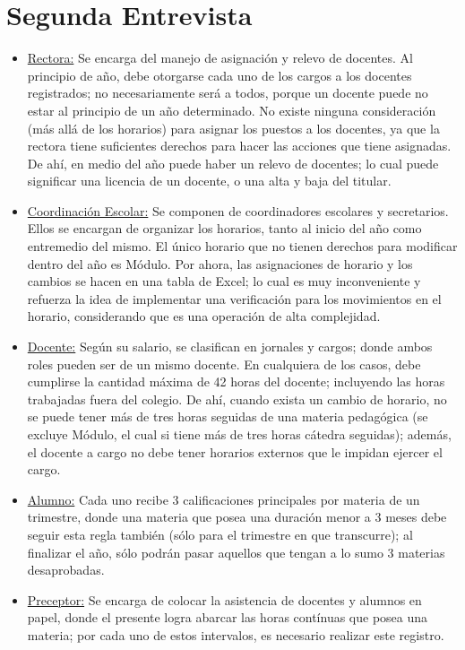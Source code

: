 \section{Segunda Entrevista}
\begin{itemize}
  \item \underline{Rectora:} Se encarga del manejo de asignación y
  relevo de docentes. Al principio de año, debe otorgarse cada uno
  de los cargos a los docentes registrados; no necesariamente será a
  todos, porque un docente puede no estar al principio de un año
  determinado. No existe ninguna consideración (más allá de los
  horarios) para asignar los puestos a los docentes, ya que la
  rectora tiene suficientes derechos para hacer las acciones que
  tiene asignadas. De ahí, en medio del año puede haber un relevo de
  docentes; lo cual puede significar una licencia de un docente, o
  una alta y baja del titular.
  \item \underline{Coordinación Escolar:} Se componen de
  coordinadores escolares y secretarios. Ellos se encargan de
  organizar los horarios, tanto al inicio del año como entremedio del
  mismo. El único horario que no tienen derechos para modificar dentro
  del año es Módulo. Por ahora, las asignaciones de horario y los
  cambios se hacen en una tabla de Excel; lo cual es muy inconveniente
  y refuerza la idea de implementar una verificación para los
  movimientos en el horario, considerando que es una operación de alta
  complejidad.
  \item \underline{Docente:} Según su salario, se clasifican en
  jornales y cargos; donde ambos roles pueden ser de un mismo docente.
  En cualquiera de los casos, debe cumplirse la cantidad máxima de 42
  horas del docente; incluyendo las horas trabajadas fuera del colegio.
  De ahí, cuando exista un cambio de horario, no se puede tener más de
  tres horas seguidas de una materia pedagógica (se excluye Módulo, el
  cual si tiene más de tres horas cátedra seguidas); además, el docente
  a cargo no debe tener horarios externos que le impidan ejercer el
  cargo.
  \item \underline{Alumno:} Cada uno recibe 3 calificaciones principales
  por materia de un trimestre, donde una materia que posea una duración
  menor a 3 meses debe seguir esta regla también (sólo para el trimestre
  en que transcurre); al finalizar el año, sólo podrán pasar aquellos que
  tengan a lo sumo 3 materias desaprobadas.
  \item \underline{Preceptor:} Se encarga de colocar la asistencia de
  docentes y alumnos en papel, donde el presente logra abarcar las horas
  contínuas que posea una materia; por cada uno de estos intervalos, es
  necesario realizar este registro.
\end{itemize}
